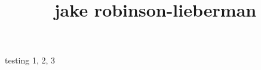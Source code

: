 \documentclass[11pt, oneside]{article}
\title{jake robinson-lieberman}
\begin{document}
\maketitle

testing 1, 2, 3
\end{document}
